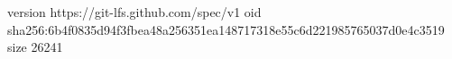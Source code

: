 version https://git-lfs.github.com/spec/v1
oid sha256:6b4f0835d94f3fbea48a256351ea148717318e55c6d221985765037d0e4c3519
size 26241

